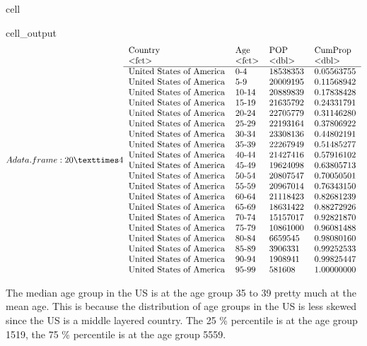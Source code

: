 \documentclass[letterpaper,10pt,english]{jupyterBook}
\begin{document}
\begin{sphinxuseclass}{cell}
\begin{sphinxVerbatimOutput}
\begin{sphinxuseclass}{cell_output}\begin{equation*}
\begin{split}A data.frame: 20 × 4
\begin{tabular}{llll}
 Country & Age & POP & CumProp\\
 <fct> & <fct> & <dbl> & <dbl>\\
\hline
	 United States of America & 0-4   & 18538353 & 0.05563755\\
	 United States of America & 5-9   & 20009195 & 0.11568942\\
	 United States of America & 10-14 & 20889839 & 0.17838428\\
	 United States of America & 15-19 & 21635792 & 0.24331791\\
	 United States of America & 20-24 & 22705779 & 0.31146280\\
	 United States of America & 25-29 & 22193164 & 0.37806922\\
	 United States of America & 30-34 & 23308136 & 0.44802191\\
	 United States of America & 35-39 & 22267949 & 0.51485277\\
	 United States of America & 40-44 & 21427416 & 0.57916102\\
	 United States of America & 45-49 & 19624098 & 0.63805713\\
	 United States of America & 50-54 & 20807547 & 0.70050501\\
	 United States of America & 55-59 & 20967014 & 0.76343150\\
	 United States of America & 60-64 & 21118423 & 0.82681239\\
	 United States of America & 65-69 & 18631422 & 0.88272926\\
	 United States of America & 70-74 & 15157017 & 0.92821870\\
	 United States of America & 75-79 & 10861000 & 0.96081488\\
	 United States of America & 80-84 &  6659545 & 0.98080160\\
	 United States of America & 85-89 &  3906331 & 0.99252533\\
	 United States of America & 90-94 &  1908941 & 0.99825447\\
	 United States of America & 95-99 &   581608 & 1.00000000\\
\end{tabular}\end{split}
\end{equation*}
\end{sphinxuseclass}\end{sphinxVerbatimOutput}

\end{sphinxuseclass}
\sphinxAtStartPar
The median age group in the US is at the age group 35 to 39 pretty much at the mean age. This is because the distribution of age groups in the US is less skewed since the US is a middle layered country. The 25 \% percentile is at the age group 15\sphinxhyphen{}19, the 75 \% percentile is at the age group 55\sphinxhyphen{}59.
\end{document}

